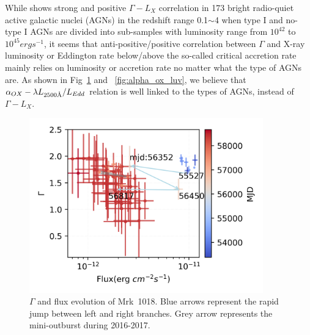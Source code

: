 \documentclass{aastex63}
\newcommand{\angstrom}{\text{\normalfont\AA}}
\begin{document}
While \citet{2008AJ....135.1505S} shows strong and positive $\Gamma-L_X$ correlation in 173 bright radio-quiet active galactic nuclei (AGNs) in the redshift range 0.1$\sim$4 when type I and no-type I AGNs are divided into sub-samples with luminosity range from $10^{42}$ to $10^{45} erg s^{-1}$, it seems that anti-positive/positive correlation between $\Gamma$ and X-ray luminosity or Eddington rate below/above the so-called critical accretion rate mainly relies on luminosity or accretion rate no matter what the type of AGNs are. As shown in Fig~\ref{fig:xrayappendgood-fandg-tmap} and ~\ref{fig:alpha_ox_luv}, we believe that $\alpha_{OX}-\lambda L_{2500\angstrom}/L_{Edd}$ relation is well linked to the types of AGNs, instead of $\Gamma-L_{X}$.    
 
 

\begin{figure}
\centering
	\includegraphics[width=0.9\textwidth]{./pic/xrayappendgood-errorbar-f-g-tmap.png}
    \caption{$\Gamma$ and flux evolution of Mrk~1018. Blue arrows represent the rapid jump between left and right branches. Grey arrow represents the mini-outburst during 2016-2017.}
    \label{fig:xrayappendgood-fandg-tmap}
\end{figure}
\end{document}
